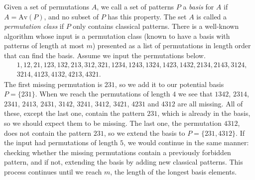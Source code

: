 \documentclass[a4paper]{article}
\newcommand{\Av}{\mathrm{Av}}
\begin{document}
Given a set of permutations $A$, we call a set of patterns $P$ a \emph{basis}
for $A$ if $A = \Av(P)$, and no subset of $P$ has this property. The set $A$ is
called a \emph{permutation class} if $P$ only contains classical patterns.
There is a well-known algorithm whose input is a permutation class (known to have a
basis with patterns of length at most $m$) presented
as a list of permutations in length order that can find the basis. Assume we
input the permutations below.
\begin{align*}
   & 1,
  12,
  21,
  123,
  132,
  213,
  312,
  321,
  1234,
  1243,
  1324,
  1423,
  1432,
  2134,
  2143,
  3124,    \\
   & 3214,
  4123,
  4132,
  4213,
  4321.
\end{align*}
The first missing permutation is $231$, so we add it to our potential basis $P = \{231\}$.
When we reach the permutations of length $4$ we see that $1342$, $2314$,
$2341$, $2413$, $2431$, $3142$, $3241$, $3412$, $3421$, $4231$ and $4312$ are all missing.
All of these, except the last one, contain the pattern $231$, which is already in the basis, so we should expect them to be missing.
The last one, the permutation $4312$, does not contain the pattern $231$, so we extend the basis to
$P = \{231, 4312\}$. If the input had permutations of length $5$, we would continue in the
same manner: checking whether the missing permutations contain a previously forbidden pattern, and
if not, extending the basis by adding new classical patterns. This process continues until we
reach $m$, the length of the longest basis elements.
\end{document}
